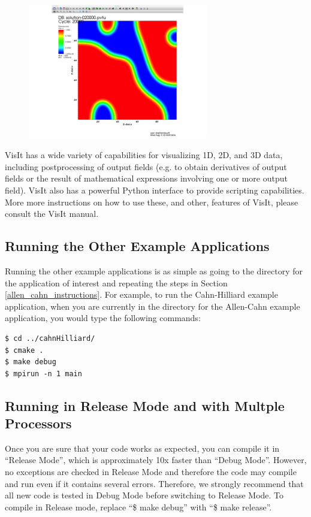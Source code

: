 \documentclass[10pt]{article} %
\begin{document}
\begin{figure}[H]
\vspace{0pt}
\centering
\includegraphics[width=0.7\textwidth]{visit_final_result.png}
\vspace{0pt}
\end{figure}

VisIt has a wide variety of capabilities for visualizing 1D, 2D, and 3D data, including postprocessing of output fields (e.g. to obtain derivatives of output fields or the result of mathematical expressions involving one or more output field). VisIt also has a powerful Python interface to provide scripting capabilities. More more instructions on how to use these, and other, features of VisIt, please consult the VisIt manual.

\subsection{Running the Other Example Applications}
Running the other example applications is as simple as going to the directory for the application of interest and repeating the steps in Section \ref{allen_cahn_instructions}. For example, to run the Cahn-Hilliard example application, when you are currently in the directory for the Allen-Cahn example application, you would type the following commands:
\begin{lstlisting}
$ cd ../cahnHilliard/ 
$ cmake . 
$ make debug 
$ mpirun -n 1 main 
\end{lstlisting}

\subsection{Running in Release Mode and with Multple Processors} \label{release_multicore}
Once you are sure that your code works as expected, you can compile it in ``Release Mode'', which is approximately 10x faster than ``Debug Mode''. However, no exceptions are checked in Release Mode and therefore the code may compile and run even if it contains several errors. Therefore, we strongly recommend that all new code is tested in Debug Mode before switching to Release Mode. To compile in Release mode, replace ``\$ make debug'' with ``\$ make release''.
\end{document}
